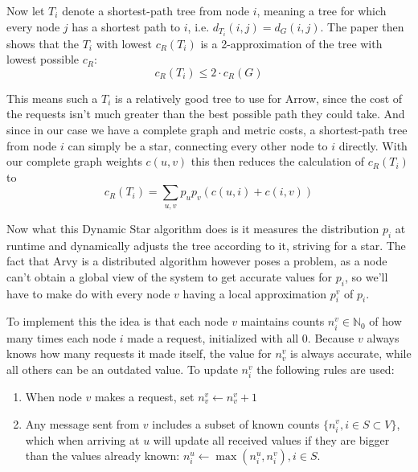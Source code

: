 \documentclass[a4paper, oneside]{discothesis}
\begin{document}
Now let $T_i$ denote a shortest-path tree from node $i$, meaning a tree for which every node $j$ has a shortest path to $i$, i.e. $d_{T_i}(i,j)=d_G(i,j)$. The paper then shows that the $T_i$ with lowest $c_R(T_i)$ is a 2-approximation of the tree with lowest possible $c_R$:
\begin{equation}
c_R(T_i)\leq 2\cdot c_R(G)
\end{equation}

This means such a $T_i$ is a relatively good tree to use for Arrow, since the cost of the requests isn't much greater than the best possible path they could take. And since in our case we have a complete graph and metric costs, a shortest-path tree from node $i$ can simply be a star, connecting every other node to $i$ directly. With our complete graph weights $c(u,v)$ this then reduces the calculation of $c_R(T_i)$ to
\begin{equation}
\label{dynstarc}
c_R(T_i)=\sum_{u,v}p_up_v(c(u,i)+c(i,v))
\end{equation}

Now what this Dynamic Star algorithm does is it measures the distribution $p_i$ at runtime and dynamically adjusts the tree according to it, striving for a star. The fact that Arvy is a distributed algorithm however poses a problem, as a node can't obtain a global view of the system to get accurate values for $p_i$, so we'll have to make do with every node $v$ having a local approximation $p_i^v$ of $p_i$.

To implement this the idea is that each node $v$ maintains counts $n_i^v\in\mathbb{N}_0$ of how many times each node $i$ made a request, initialized with all $0$. Because $v$ always knows how many requests it made itself, the value for $n_v^v$ is always accurate, while all others can be an outdated value. To update $n_i^v$ the following rules are used:
\begin{enumerate}
\item When node $v$ makes a request, set $n_v^v\gets n_v^v+1$
\label{rule1}
\item Any message sent from $v$ includes a subset of known counts $\{n_i^v,i\in S\subset V\}$, which when arriving at $u$ will update all received values if they are bigger than the values already known: $n_i^u\gets \max(n_i^u,n_i^v),i\in S$.
\end{enumerate}
\end{document}
